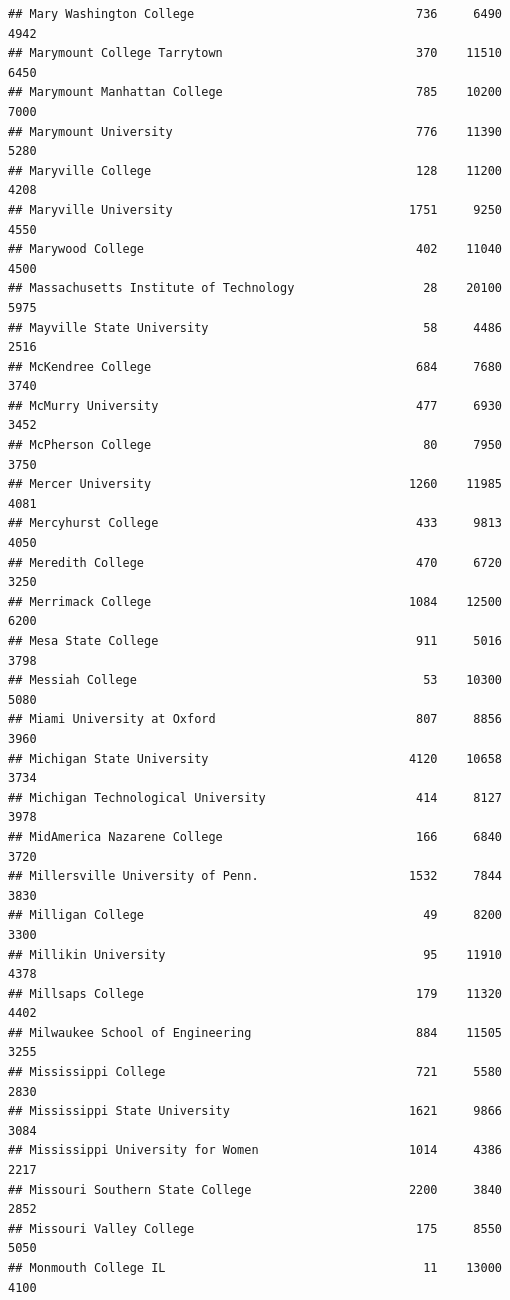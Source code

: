 \documentclass[
]{article}
\begin{document}
\begin{verbatim}
## Mary Washington College                               736     6490       4942
## Marymount College Tarrytown                           370    11510       6450
## Marymount Manhattan College                           785    10200       7000
## Marymount University                                  776    11390       5280
## Maryville College                                     128    11200       4208
## Maryville University                                 1751     9250       4550
## Marywood College                                      402    11040       4500
## Massachusetts Institute of Technology                  28    20100       5975
## Mayville State University                              58     4486       2516
## McKendree College                                     684     7680       3740
## McMurry University                                    477     6930       3452
## McPherson College                                      80     7950       3750
## Mercer University                                    1260    11985       4081
## Mercyhurst College                                    433     9813       4050
## Meredith College                                      470     6720       3250
## Merrimack College                                    1084    12500       6200
## Mesa State College                                    911     5016       3798
## Messiah College                                        53    10300       5080
## Miami University at Oxford                            807     8856       3960
## Michigan State University                            4120    10658       3734
## Michigan Technological University                     414     8127       3978
## MidAmerica Nazarene College                           166     6840       3720
## Millersville University of Penn.                     1532     7844       3830
## Milligan College                                       49     8200       3300
## Millikin University                                    95    11910       4378
## Millsaps College                                      179    11320       4402
## Milwaukee School of Engineering                       884    11505       3255
## Mississippi College                                   721     5580       2830
## Mississippi State University                         1621     9866       3084
## Mississippi University for Women                     1014     4386       2217
## Missouri Southern State College                      2200     3840       2852
## Missouri Valley College                               175     8550       5050
## Monmouth College IL                                    11    13000       4100

\end{verbatim}
\end{document}
